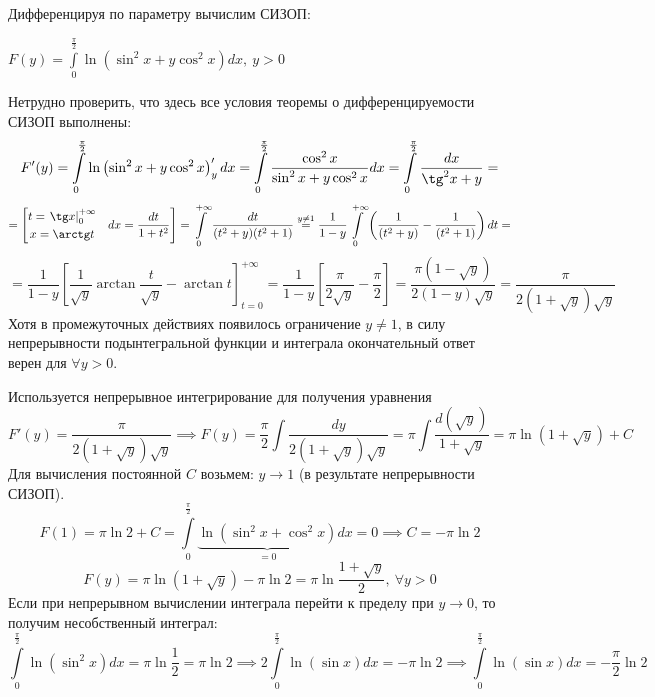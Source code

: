 \documentclass[../../main.tex]{subfiles}
\begin{document}
\begin{example}
    Дифференцируя по параметру вычислим СИЗОП:

    $F(y) = \int\limits_0^{\frac{\pi}{2}} \ln
    \left( \sin^2 x + y \cos^2 x \right) dx, \ y > 0$

    Нетрудно проверить, что здесь все условия теоремы о дифференцируемости СИЗОП
    выполнены:
    \[ F'(y) = \int\limits_0^{\frac{\pi}{2}} \ln
    \left( \sin^2 x + y \cos^2 x \right)'_y dx = 
    \int\limits_0^{\frac{\pi}{2}} \dfrac{\cos^2 x}{\sin^2 x + y \cos^2 x} dx =
    \int\limits_0^{\frac{\pi}{2}} \dfrac{dx}{\tg^2 x  + y} = \]
    \[ = \left[
    \begin{gathered}
        t = \left. \tg x \right|_0^{+\infty} \\
        x = \arctan t
    \end{gathered} \ \ \
    dx = \dfrac{dt}{1 + t^2}
    \right] = \int\limits_0^{+\infty} \dfrac{dt}{(t^2 + y)(t^2 + 1)}
    \overset{y \neq 1}{=}
    \dfrac{1}{1-y} \int\limits_0^{+\infty} \left( \dfrac{1}{(t^2 + y)} -
    \dfrac{1}{(t^2 + 1)} \right) dt = \]
    \[ = \dfrac{1}{1 - y} \left[ \dfrac{1}{\sqrt{y}} \arctan \dfrac{t}{\sqrt{y}}
    - \arctan t \right]_{t = 0}^{+\infty} = \dfrac{1}{1 - y}
    \left[ \dfrac{\pi}{2 \sqrt{y}}
    - \dfrac{\pi}{2} \right] = \dfrac{\pi (1 - \sqrt{y})}{2 (1 - y) \sqrt{y}} =
    \dfrac{\pi}{2 (1 + \sqrt{y}) \sqrt{y}} \]
    Хотя в промежуточных действиях появилось ограничение $y \neq 1$,
    в силу непрерывности
    подынтегральной функции и интеграла окончательный ответ верен для
    $\forall y > 0$.

    Используется непрерывное интегрирование для получения уравнения
    \[F'(y) = \dfrac{\pi}{2(1+\sqrt{y})\sqrt{y}} \implies F(y) =
    \dfrac{\pi}{2} \int \dfrac{dy}{2 (1 + \sqrt{y}) \sqrt{y}}  = \pi
    \int \dfrac{d(\sqrt{y})}{1 + \sqrt{y}} = \pi \ln (1 + \sqrt{y}) + C \]
    Для вычисления постоянной $C$ возьмем: $y \to 1$ (в результате
    непрерывности СИЗОП).
    \[F(1) = \pi \ln 2 + C = \int\limits_0^{\frac{\pi}{2}}
    \underbrace{ \ln \left( \sin^2 x + \cos^2 x \right)}_{= 0} dx = 0
    \implies C = -\pi \ln 2\]
    \[F(y) = \pi \ln(1 + \sqrt{y}) - \pi \ln 2 =
    \pi \ln \dfrac{1 + \sqrt{y}}{2}, \ \forall y > 0\]
    Если при непрерывном вычислении интеграла перейти к пределу при $y \to 0$,
    то получим несобственный интеграл:
    \[ \int\limits_0^{\frac{\pi}{2}} \ln (\sin^2 x)dx = \pi \ln \dfrac{1}{2} =
    \pi \ln 2 \implies 2 \int\limits_0^{\frac{\pi}{2}} \ln (\sin x) dx = 
    - \pi \ln 2 \implies \int\limits_0^{\frac{\pi}{2}} \ln (\sin x) dx = 
    - \dfrac{\pi}{2}\ln 2\]
    
\end{example}
\end{document}
